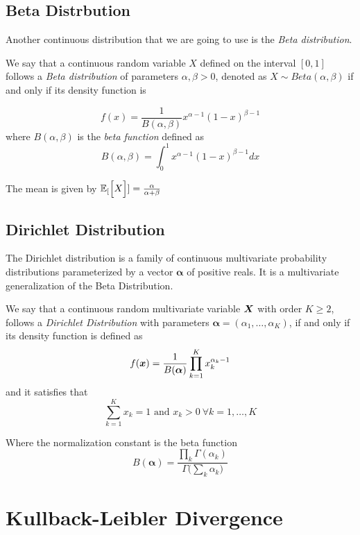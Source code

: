 \subsection{Beta Distrbution}

Another continuous distribution that we are going to use is the \emph{Beta
  distribution}.

\begin{definition}
We say that a continuous random variable \(X\) defined on the
interval \([0,1]\) follows a \emph{Beta distribution} of parameters \(\alpha,
\beta > 0\), denoted as \(X \sim Beta(\alpha, \beta)\) if and only if its
density function is

\[
  f(x) = \frac{1}{B(\alpha, \beta)}x^{\alpha - 1}(1-x)^{\beta -1}
\]
where \(B(\alpha, \beta)\) is the \emph{beta function} defined as
\[
  B(\alpha, \beta) = \int_0^1 x^{\alpha - 1}(1-x)^{\beta -1} dx
\]
\end{definition}

The mean is given by \(\mathbb{E}_{[}\Big[X\Big]] = \frac{\alpha}{\alpha + \beta}\)

\subsection{Dirichlet Distribution}

The Dirichlet distribution is a family of continuous multivariate probability
distributions parameterized by a vector \(\bm{\alpha}\) of positive reals. It is
a multivariate generalization of the Beta Distribution.

\begin{definition}
  We say that a continuous random multivariate variable \(\bm{X}\) with order
  \(K \geq 2\), follows a \emph{Dirichlet
    Distribution} with parameters \(\bm{\alpha} = (\alpha_{1}, \dots, \alpha_{K})\), if and
  only if its density function is defined as
  \[
    f(\bm{x}) = \frac{1}{B(\bm{\alpha})}\prod_{k = 1}^{K}x_{k}^{\alpha_{k}-1}
  \]
  and it satisfies that
  \[
    \sum_{k=1}^{K} x_{k} = 1 \text{ and } x_{k} > 0 \ \forall k=1,\dots,K
  \]
\end{definition}

Where the normalization constant is the beta function
\[
  B(\bm{\alpha}) = \frac{\prod_{k} \Gamma (\alpha_{k})}{\Gamma \big( \sum_{k}\alpha_{k} \big)}
\]



\section{Kullback-Leibler Divergence}

